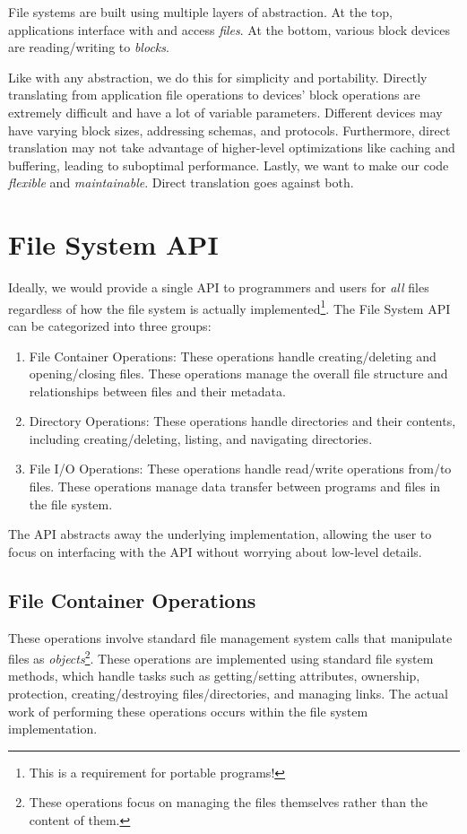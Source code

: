 \documentclass{report}
\newcommand{\abstractionBegin}[1]{\begin{tcolorbox}[colback=violet!5!white,colframe=violet,title={Abstraction:
      #1}]}
\newcommand{\abstractionEnd}{\end{tcolorbox}}
\begin{document}
File systems are built using multiple layers of abstraction. At the top, applications interface with
and access \textit{files}. At the bottom, various block devices are reading/writing to
\textit{blocks}.

\abstractionBegin{File Systems}
Like with any abstraction, we do this for simplicity and portability. Directly translating from
application file operations to devices' block operations are extremely difficult and have a lot of
variable parameters. Different devices may have varying block sizes, addressing schemas, and
protocols. Furthermore, direct translation may not take advantage of higher-level optimizations like
caching and buffering, leading to suboptimal performance. Lastly, we want to make our code
\textit{flexible} and \textit{maintainable}. Direct translation goes against both.
\abstractionEnd


\section{File System API}
\label{sec:FSA}
Ideally, we would provide a single API to programmers and users for \textit{all} files regardless of
how the file system is actually implemented\footnote{This is a requirement for portable
  programs!}. The File System API can be categorized into three groups:

\begin{enumerate}[label=\textit{(\roman*)}]
\item File Container Operations: These operations handle creating/deleting and opening/closing files. These operations manage
  the overall file structure and relationships between files and their metadata.
\item Directory Operations: These operations handle directories and their contents, including
  creating/deleting, listing, and navigating directories.
\item File I/O Operations: These operations handle read/write operations from/to files. These
  operations manage data transfer between programs and files in the file system.
\end{enumerate}

The API abstracts away the underlying implementation, allowing the user to focus on interfacing
with the API without worrying about low-level details.


\subsection{File Container Operations}
\label{subsec:FCO}
These operations involve standard file management system calls that manipulate files as
\textit{objects}\footnote{These operations focus on managing the files themselves rather than the
  content of them.}. These operations are implemented using standard file system methods, which
handle tasks such as getting/setting attributes, ownership, protection, creating/destroying
files/directories, and managing links. The actual work of performing these operations occurs within
the file system implementation.
\end{document}
